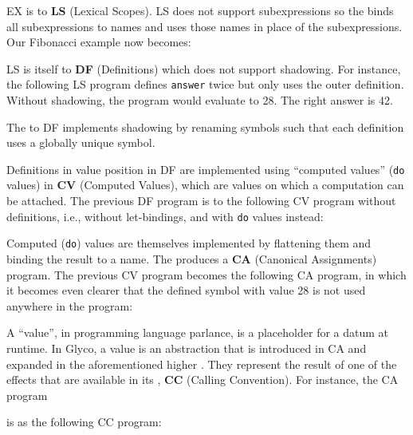 \documentclass[main.tex]{subfiles}
\begin{document}
EX is \lowered{} to \textbf{LS} (Lexical Scopes). LS does not support subexpressions so the  binds all subexpressions to names and uses those names in place of the subexpressions. Our Fibonacci example now becomes:


LS is itself \lowered{} to \textbf{DF} (Definitions) which does not support shadowing. For instance, the following LS program defines \texttt{answer} twice but only uses the outer definition. Without shadowing, the program would evaluate to 28. The right answer is 42.


The  to DF implements shadowing by renaming symbols such that each definition uses a globally unique symbol.


Definitions in value position in DF are implemented using \enquote{computed values} (\texttt{do} values) in \textbf{CV} (Computed Values), which are values on which a computation can be attached. The previous DF program is \lowered{} to the following CV program without definitions, i.e., without let-bindings, and with \texttt{do} values instead:


Computed (\texttt{do}) values are themselves implemented by flattening them and binding the result to a name. The  produces a \textbf{CA} (Canonical Assignments) program. The previous CV program becomes the following CA program, in which it becomes even clearer that the defined symbol with value 28 is not used anywhere in the program:


A \enquote{value}, in programming language parlance, is a placeholder for a datum at runtime. In Glyco, a value is an abstraction that is introduced in CA and expanded in the aforementioned higher . They represent the result of one of the effects that are available in its , \textbf{CC} (Calling Convention). For instance, the CA program

is \lowered{} as the following CC program:

\end{document}
